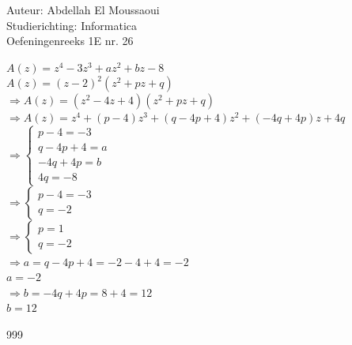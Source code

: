 \documentclass[a4paper]{article}
\begin{document}
  
\noindent \large Auteur: Abdellah El Moussaoui \\
\noindent \large Studierichting: Informatica\\
\noindent \large Oefeningenreeks 1E nr. 26\\

\medskip

\normalsize

\medskip

$A(z)=z^4-3z^3+az^2+bz-8$\\

$A(z)=(z-2)^2(z^2+pz+q)$\\

$\Rightarrow A(z)=(z^2-4z+4)(z^2+pz+q)$\\

$\Rightarrow A(z)=z^4+(p-4)z^3+(q-4p+4)z^2+(-4q+4p)z+4q$\\

$\Rightarrow \left\{
\begin{array}{l}
p-4=-3\\
q-4p+4=a\\
-4q+4p=b\\
4q=-8
\end{array}
\right.$\\

$\Rightarrow \left\{
\begin{array}{l}
p-4=-3\\
q=-2
\end{array}
\right.$\\

$\Rightarrow \left\{
\begin{array}{l}
p=1\\
q=-2
\end{array}
\right.$\\

$\Rightarrow a=q-4p+4=-2-4+4=-2$\\

$\boxed{a = -2}$\\

$\Rightarrow b=-4q+4p=8+4=12$\\

$\boxed{b = 12}$\\

\begin{thebibliography}{999}
\end{thebibliography}
\end{document}
